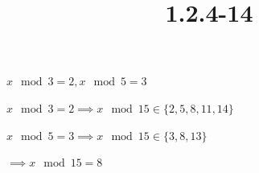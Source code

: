 \documentclass{article}
\title{1.2.4-14}
\begin{document}
\maketitle

$x \mod 3 = 2, x \mod 5 = 3$

$x \mod 3 = 2 \implies x \mod 15 \in \{ 2, 5, 8, 11, 14 \}$

$x \mod 5 = 3 \implies x \mod 15 \in \{ 3, 8, 13 \}$

$\implies x \mod 15 = 8$
\end{document}
